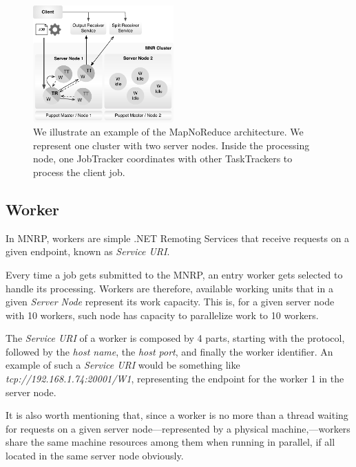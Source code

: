 \documentclass[times, 10pt,twocolumn]{article}
\begin{document}
        \begin{figure}[!h]
            \begin{center}
                \includegraphics[width=0.48\textwidth]{pics/architecture.pdf}
                \caption{We illustrate an example of the MapNoReduce architecture. We represent one cluster with two server nodes. Inside the processing node, one JobTracker coordinates with other TaskTrackers to process the client job.  }
                \label{fig:mnr-architecture}
            \end{center}
        \end{figure}
        
    	\subsection{Worker}
        
        In \ac{MNRP}, workers are simple .NET Remoting Services that receive requests on a given endpoint, known as \emph{Service URI}. 
        
        Every time a job gets submitted to the \ac{MNRP}, an entry worker gets selected to handle its processing. Workers are therefore, available working units that in a given \emph{Server Node} represent its work capacity. This is, for a given server node with 10 workers, such node has capacity to parallelize work to 10 workers.
        
        The \emph{Service URI} of a worker is composed by 4 parts, starting with the protocol, followed by the \emph{host name}, the \emph{host port}, and finally the worker identifier. An example of such a \emph{Service URI} would be something like \emph{{\small tcp://192.168.1.74:20001/W1}}, representing the endpoint for the worker 1 in the server node.
        
        It is also worth mentioning that, since a worker is no more than a thread waiting for requests on a given server node—represented by a physical machine,—workers share the same machine resources among them when running in parallel, if all located in the same server node obviously.
        
\end{document}
